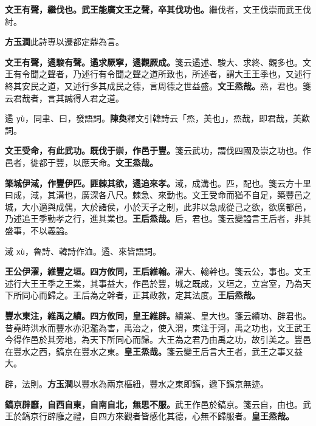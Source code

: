 \textbf{文王有聲，繼伐也。武王能廣文王之聲，卒其伐功也。}{\footnotesize 繼伐者，文王伐崇而武王伐紂。}

\begin{quoting}\textbf{方玉潤}此詩專以遷都定鼎為言。\end{quoting}

\textbf{文王有聲，遹駿有聲。遹求厥寧，遹觀厥成。}{\footnotesize 箋云遹述、駿大、求終、觀多也。文王有令聞之聲者，乃述行有令聞之聲之道所致也，所述者，謂大王王季也，又述行終其安民之道，又述行多其成民之德，言周德之世益盛。}\textbf{文王烝哉。}{\footnotesize 烝，君也。箋云君哉者，言其誠得人君之道。}

\begin{quoting}遹 \texttt{yù}，同聿、曰，發語詞。\textbf{陳奐}釋文引韓詩云「烝，美也」，烝哉，即君哉，美歎詞。\end{quoting}

\textbf{文王受命，有此武功。既伐于崇，作邑于豐。}{\footnotesize 箋云武功，謂伐四國及崇之功也。作邑者，徙都于豐，以應天命。}\textbf{文王烝哉。}

\textbf{築城伊淢，作豐伊匹。匪棘其欲，遹追來孝。}{\footnotesize 淢，成溝也。匹，配也。箋云方十里曰成，淢，其溝也，廣深各八尺。棘急、來勤也。文王受命而猶不自足，築豐邑之城，大小適與成偶，大於諸侯，小於天子之制，此非以急成從己之欲，欲廣都邑，乃述追王季勤孝之行，進其業也。}\textbf{王后烝哉。}{\footnotesize 后，君也。箋云變謚言王后者，非其盛事，不以義謚。}

\begin{quoting}淢 \texttt{xù}，魯詩、韓詩作洫。遹、來皆語詞。\end{quoting}

\textbf{王公伊濯，維豐之垣。四方攸同，王后維翰。}{\footnotesize 濯大、翰幹也。箋云公，事也。文王述行大王王季之王業，其事益大，作邑於豐，城之既成，又垣之，立宮室，乃為天下所同心而歸之。王后為之幹者，正其政教，定其法度。}\textbf{王后烝哉。}

\textbf{豐水東注，維禹之績。四方攸同，皇王維辟。}{\footnotesize 績業、皇大也。箋云績功、辟君也。昔堯時洪水而豐水亦氾濫為害，禹治之，使入渭，東注于河，禹之功也，文王武王今得作邑於其旁地，為天下所同心而歸。大王為之君乃由禹之功，故引美之。豐邑在豐水之西，鎬京在豐水之東。}\textbf{皇王烝哉。}{\footnotesize 箋云變王后言大王者，武王之事又益大。}

\begin{quoting}辟，法則。\textbf{方玉潤}以豐水為兩京樞紐，豐水之東即鎬，遞下鎬京無迹。\end{quoting}

\textbf{鎬京辟廱，自西自東，自南自北，無思不服。}{\footnotesize 武王作邑於鎬京。箋云自，由也。武王於鎬京行辟廱之禮，自四方來觀者皆感化其德，心無不歸服者。}\textbf{皇王烝哉。}

